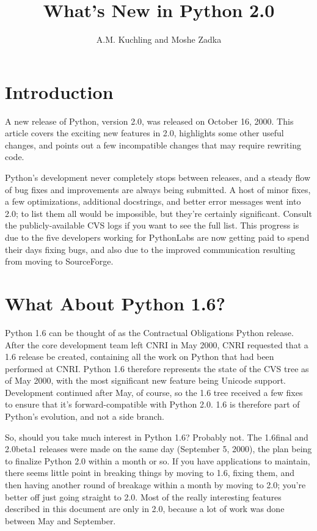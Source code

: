 \documentclass{howto}
\title{What's New in Python 2.0}
\author{A.M. Kuchling and Moshe Zadka}
\begin{document}
\maketitle\tableofcontents

\section{Introduction}

A new release of Python, version 2.0, was released on October 16, 2000. This
article covers the exciting new features in 2.0, highlights some other
useful changes, and points out a few incompatible changes that may require
rewriting code.

Python's development never completely stops between releases, and a
steady flow of bug fixes and improvements are always being submitted.
A host of minor fixes, a few optimizations, additional docstrings, and
better error messages went into 2.0; to list them all would be
impossible, but they're certainly significant.  Consult the
publicly-available CVS logs if you want to see the full list.  This
progress is due to the five developers working for 
PythonLabs are now getting paid to spend their days fixing bugs,
and also due to the improved communication resulting 
from moving to SourceForge.

\section{What About Python 1.6?}

Python 1.6 can be thought of as the Contractual Obligations Python
release.  After the core development team left CNRI in May 2000, CNRI
requested that a 1.6 release be created, containing all the work on
Python that had been performed at CNRI.  Python 1.6 therefore
represents the state of the CVS tree as of May 2000, with the most
significant new feature being Unicode support.  Development continued
after May, of course, so the 1.6 tree received a few fixes to ensure
that it's forward-compatible with Python 2.0.  1.6 is therefore part
of Python's evolution, and not a side branch.

So, should you take much interest in Python 1.6?  Probably not.  The
1.6final and 2.0beta1 releases were made on the same day (September 5,
2000), the plan being to finalize Python 2.0 within a month or so.  If
you have applications to maintain, there seems little point in
breaking things by moving to 1.6, fixing them, and then having another
round of breakage within a month by moving to 2.0; you're better off
just going straight to 2.0.  Most of the really interesting features
described in this document are only in 2.0, because a lot of work was
done between May and September.  
\end{document}
